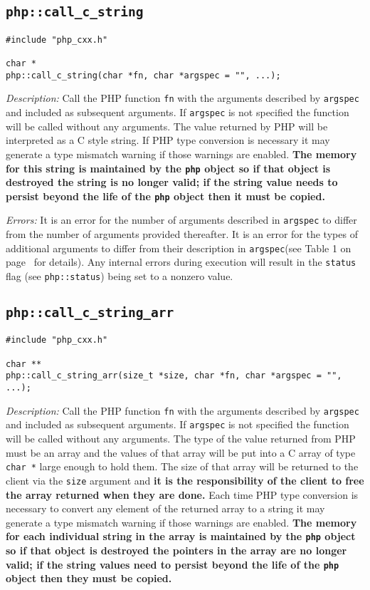 \documentclass[11pt,titlepage]{article}
\begin{document}
\subsection{\texttt{php::call\_c\_string}}

\begin{verbatim}
#include "php_cxx.h"

char *
php::call_c_string(char *fn, char *argspec = "", ...);
\end{verbatim}

\emph{Description:} Call the PHP function \verb|fn| with the arguments described by \verb|argspec| and included as subsequent arguments. If \verb|argspec| is not specified the function will be called without any arguments. The value returned by PHP will be interpreted as a C style string. If PHP type conversion is necessary it may generate a type mismatch warning if those warnings are enabled. \textbf{The memory for this string is maintained by the \texttt{php} object so if that object is destroyed the string is no longer valid; if the string value needs to persist beyond the life of the \texttt{php} object then it must be copied.}

\emph{Errors:} It is an error for the number of arguments described in \verb|argspec| to differ from the number of arguments provided thereafter. It is an error for the types of additional arguments to differ from their description in \verb|argspec|(see Table 1 on page~\pageref{Table1} for details). Any internal errors during execution will result in the \verb|status| flag (see \verb|php::status|) being set to a nonzero value.

\subsection{\texttt{php::call\_c\_string\_arr}}

\begin{verbatim}
#include "php_cxx.h"

char **
php::call_c_string_arr(size_t *size, char *fn, char *argspec = "", ...);
\end{verbatim}

\emph{Description:} Call the PHP function \verb|fn| with the arguments described by \verb|argspec| and included as subsequent arguments. If \verb|argspec| is not specified the function will be called without any arguments. The type of the value returned from PHP must be an array and the values of that array will be put into a C array of type \verb|char *| large enough to hold them. The size of that array will be returned to the client via the \verb|size| argument and \textbf{it is the responsibility of the client to free the array returned when they are done.} Each time PHP type conversion is necessary to convert any element of the returned array to a string it may generate a type mismatch warning if those warnings are enabled.  \textbf{The memory for each individual string in the array is maintained by the \texttt{php} object so if that object is destroyed the pointers in the array are no longer valid; if the string values need to persist beyond the life of the \texttt{php} object then they must be copied.}
\end{document}
